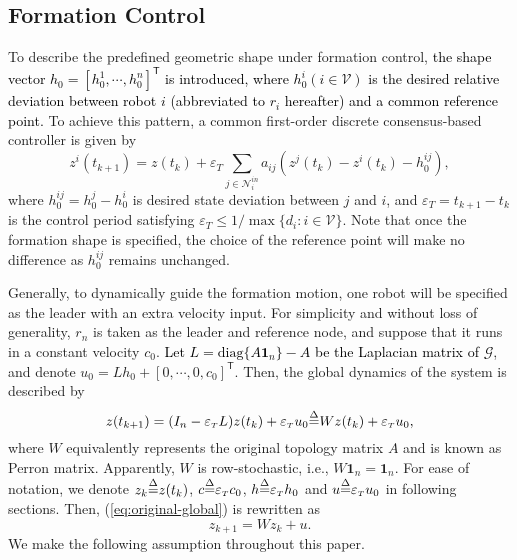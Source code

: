 \documentclass[12pt,journal,draftclsnofoot,onecolumn]{IEEEtran}
\let \sss=\scriptscriptstyle
\begin{document}
\subsection{Formation Control} \label{s2-c}
To describe the predefined geometric shape under formation control, 
\textcolor{black}{the shape vector $h_0=[h_0^1,\cdots,h_0^n]^{\mathsf{T}}$ is introduced, where $h_0^i(i\in\mathcal{V})$ is the desired relative deviation between robot $i$ (abbreviated to $r_i$ hereafter) and a common reference point.} 
To achieve this pattern, a common first-order discrete consensus-based controller is given by \cite{olfati2007consensus}
\begin{equation}\label{eq-1}
z^{i}(t_{k+1})=z(t_k)+\varepsilon_{\sss T} \sum\limits_{j \in \mathcal{N}_i^{in}} {{a_{ij}}(z^j(t_k)-z^i(t_k)-h_0^{ij})},
\end{equation}
where $h_0^{ij}=h_0^j-h_0^i$ is desired state deviation between $j$ and $i$, and $\varepsilon_{\sss T}=t_{k+1}-t_{k}$ is the control period satisfying $\varepsilon_{\sss T}\le 1/\max\{d_i: i\in\mathcal{V}\}$. 
Note that once the formation shape is specified, the choice of the reference point will make no difference as $h_0^{ij}$ remains unchanged. 

Generally, to dynamically guide the formation motion, one robot will be specified as the leader with an extra velocity input. 
For simplicity and without loss of generality, $r_{n}$ is taken as the leader and reference node, and suppose that it runs in a constant velocity $c_0$. 
\textcolor{black}{Let $L=\text{diag}\{A \bm{1}_n\}-A$ be the Laplacian matrix of $\mathcal{G}$}, and denote $u_0=Lh_0+[0,\cdots,0, c_0]^\mathsf{T}$. 
Then, the global dynamics of the system is described by 
\begin{equation}\label{eq:original-global}
z(t_{k+1})= ( {I}_{n}-\varepsilon_{\sss T} L) z(t_k)+ \varepsilon_{\sss T}u_0 {\buildrel \Delta \over =} W z(t_k)+ \varepsilon_{\sss T}u_0,  
\end{equation}
where $W$ equivalently represents the original topology matrix $A$ and is known as Perron matrix. 
Apparently, $W$ is row-stochastic, i.e., $W\bm{1}_{n}=\bm{1}_{n}$. 
For ease of notation, we denote $z_{k} {\buildrel \Delta \over =} z(t_k)$, $c{\buildrel \Delta \over =}\varepsilon_{\sss T}c_0$, $h{\buildrel \Delta \over =}\varepsilon_{\sss T}h_0$ and $u{\buildrel \Delta \over =}\varepsilon_{\sss T}u_0$ in following sections. 
Then, (\ref{eq:original-global}) is rewritten as 
\begin{equation}\label{eq:global-system}
z_{k+1}= W{z_k}+ u. 
\end{equation}
We make the following assumption throughout this paper. 
\end{document}
